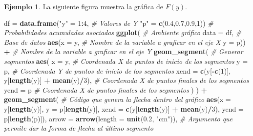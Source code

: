 \documentclass[
  11pt,
]{book}
\newenvironment{Shaded}{\begin{snugshade}}{\end{snugshade}}
\newcommand{\AttributeTok}[1]{\textcolor[rgb]{0.13,0.29,0.53}{#1}}
\newcommand{\CommentTok}[1]{\textcolor[rgb]{0.56,0.35,0.01}{\textit{#1}}}
\newcommand{\DecValTok}[1]{\textcolor[rgb]{0.00,0.00,0.81}{#1}}
\newcommand{\FloatTok}[1]{\textcolor[rgb]{0.00,0.00,0.81}{#1}}
\newcommand{\FunctionTok}[1]{\textcolor[rgb]{0.13,0.29,0.53}{\textbf{#1}}}
\newcommand{\NormalTok}[1]{#1}
\newcommand{\OtherTok}[1]{\textcolor[rgb]{0.56,0.35,0.01}{#1}}
\newcommand{\SpecialCharTok}[1]{\textcolor[rgb]{0.81,0.36,0.00}{\textbf{#1}}}
\newcommand{\StringTok}[1]{\textcolor[rgb]{0.31,0.60,0.02}{#1}}
\theoremstyle{definition}
\theoremstyle{definition}
\newtheorem{example}{Ejemplo}[chapter]
\theoremstyle{definition}
\theoremstyle{definition}
\theoremstyle{remark}
\begin{document}
\begin{example}
La siguiente figura muestra la gráfica de \(F(y)\).

\begin{Shaded}
\begin{Highlighting}[]
\NormalTok{df }\OtherTok{=} \FunctionTok{data.frame}\NormalTok{(}\StringTok{"y"} \OtherTok{=} \DecValTok{1}\SpecialCharTok{:}\DecValTok{4}\NormalTok{, }\CommentTok{\# Valores de Y}
                \StringTok{"p"} \OtherTok{=} \FunctionTok{c}\NormalTok{(}\FloatTok{0.4}\NormalTok{,}\FloatTok{0.7}\NormalTok{,}\FloatTok{0.9}\NormalTok{,}\DecValTok{1}\NormalTok{)) }\CommentTok{\# Probabilidades acumuladas asociadas}
\FunctionTok{ggplot}\NormalTok{( }\CommentTok{\# Ambiente gráfico}
  \AttributeTok{data =}\NormalTok{ df, }\CommentTok{\# Base de datos}
  \FunctionTok{aes}\NormalTok{(}\AttributeTok{x =}\NormalTok{ y, }\CommentTok{\# Nombre de la variable a graficar en el eje X}
      \AttributeTok{y =}\NormalTok{ p)) }\SpecialCharTok{+} \CommentTok{\# Nombre de la variable a graficar en el eje Y}
  \FunctionTok{geom\_segment}\NormalTok{( }\CommentTok{\# Generar segmentos}
    \FunctionTok{aes}\NormalTok{(}
      \AttributeTok{x =}\NormalTok{ y, }\CommentTok{\# Coordenada X de puntos de inicio de los segmentos}
      \AttributeTok{y =}\NormalTok{ p, }\CommentTok{\# Coordenada Y de puntos de inicio de los segmentos}
      \AttributeTok{xend =} \FunctionTok{c}\NormalTok{(y[}\SpecialCharTok{{-}}\FunctionTok{c}\NormalTok{(}\DecValTok{1}\NormalTok{)], y[}\FunctionTok{length}\NormalTok{(y)] }\SpecialCharTok{+} \FunctionTok{mean}\NormalTok{(y)}\SpecialCharTok{/}\DecValTok{3}\NormalTok{), }\CommentTok{\# Coordenada X de puntos finales de los segmentos}
      \AttributeTok{yend =}\NormalTok{ p }\CommentTok{\# Coordenada X de puntos finales de los segmentos}
\NormalTok{    )}
\NormalTok{  ) }\SpecialCharTok{+}
  \FunctionTok{geom\_segment}\NormalTok{( }\CommentTok{\# Código que genera la flecha dentro del gráfico}
    \FunctionTok{aes}\NormalTok{(}\AttributeTok{x =}\NormalTok{ y[}\FunctionTok{length}\NormalTok{(y)], }\AttributeTok{y =}\NormalTok{ p[}\FunctionTok{length}\NormalTok{(y)],}
        \AttributeTok{xend =} \FunctionTok{c}\NormalTok{(y[}\FunctionTok{length}\NormalTok{(y)] }\SpecialCharTok{+} \FunctionTok{mean}\NormalTok{(y)}\SpecialCharTok{/}\DecValTok{3}\NormalTok{), }\AttributeTok{yend =}\NormalTok{ p[}\FunctionTok{length}\NormalTok{(p)]),}
    \AttributeTok{arrow =} \FunctionTok{arrow}\NormalTok{(}\AttributeTok{length =} \FunctionTok{unit}\NormalTok{(}\FloatTok{0.2}\NormalTok{, }\StringTok{"cm"}\NormalTok{)), }\CommentTok{\# Argumento que permite dar la forma de flecha al último segmento}

\end{Highlighting}
\end{Shaded}
\end{example}
\end{document}
